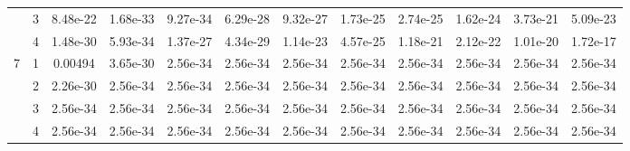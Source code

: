 \begin{landscape}
\begin{table}[htbp]
\begin{center}
{\begin{tabular}{cccccccccccc}
             & 3 & 8.48e-22 & 1.68e-33 & 9.27e-34 & 6.29e-28 & 9.32e-27 & 1.73e-25 & 2.74e-25 & 1.62e-24 & 3.73e-21 & 5.09e-23 \\
             & 4 & 1.48e-30 & 5.93e-34 & 1.37e-27 & 4.34e-29 & 1.14e-23 & 4.57e-25 & 1.18e-21 & 2.12e-22 & 1.01e-20 & 1.72e-17 \\
            \hline
            \multirow{4}{*}{7} & 1 & 0.00494 & 3.65e-30 & 2.56e-34 & 2.56e-34 & 2.56e-34 & 2.56e-34 & 2.56e-34 & 2.56e-34 & 2.56e-34 & 2.56e-34 \\
             & 2 & 2.26e-30 & 2.56e-34 & 2.56e-34 & 2.56e-34 & 2.56e-34 & 2.56e-34 & 2.56e-34 & 2.56e-34 & 2.56e-34 & 2.56e-34 \\
             & 3 & 2.56e-34 & 2.56e-34 & 2.56e-34 & 2.56e-34 & 2.56e-34 & 2.56e-34 & 2.56e-34 & 2.56e-34 & 2.56e-34 & 2.56e-34 \\
             & 4 & 2.56e-34 & 2.56e-34 & 2.56e-34 & 2.56e-34 & 2.56e-34 & 2.56e-34 & 2.56e-34 & 2.56e-34 & 2.56e-34 & 2.56e-34 \\
            \hline
        \end{tabular}
    }
    \label{tab:wilcoxRvalues_w1_10}
    \end{center}
    \end{table}
\end{landscape}


